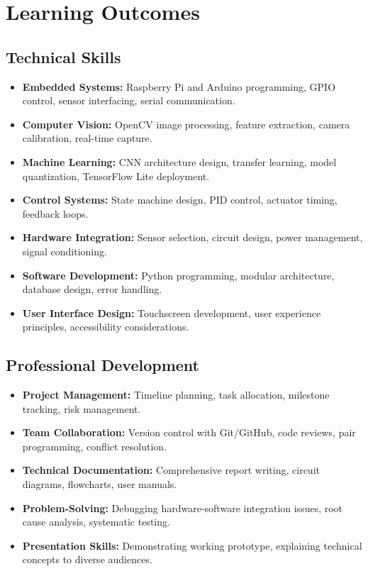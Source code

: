 \section{Learning Outcomes}

\subsection{Technical Skills}
\begin{itemize}
    \item \textbf{Embedded Systems:} Raspberry Pi and Arduino programming, GPIO control, sensor interfacing, serial communication.
    \item \textbf{Computer Vision:} OpenCV image processing, feature extraction, camera calibration, real-time capture.
    \item \textbf{Machine Learning:} CNN architecture design, transfer learning, model quantization, TensorFlow Lite deployment.
    \item \textbf{Control Systems:} State machine design, PID control, actuator timing, feedback loops.
    \item \textbf{Hardware Integration:} Sensor selection, circuit design, power management, signal conditioning.
    \item \textbf{Software Development:} Python programming, modular architecture, database design, error handling.
    \item \textbf{User Interface Design:} Touchscreen development, user experience principles, accessibility considerations.
\end{itemize}

\subsection{Professional Development}
\begin{itemize}
    \item \textbf{Project Management:} Timeline planning, task allocation, milestone tracking, risk management.
    \item \textbf{Team Collaboration:} Version control with Git/GitHub, code reviews, pair programming, conflict resolution.
    \item \textbf{Technical Documentation:} Comprehensive report writing, circuit diagrams, flowcharts, user manuals.
    \item \textbf{Problem-Solving:} Debugging hardware-software integration issues, root cause analysis, systematic testing.
    \item \textbf{Presentation Skills:} Demonstrating working prototype, explaining technical concepts to diverse audiences.
\end{itemize}

